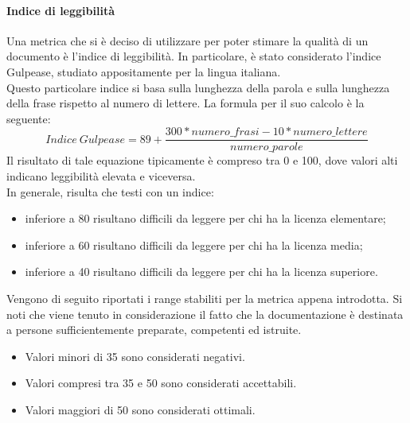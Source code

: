 \documentclass[../PianoDiQualifica.tex]{subfiles}
\begin{document}
				\paragraph{Indice di leggibilità}
				Una metrica che si è deciso di utilizzare per poter stimare la qualità di un documento è l'indice di leggibilità. In particolare, è stato considerato l'indice Gulpease, studiato appositamente per la lingua italiana.				\\Questo particolare indice si basa sulla lunghezza della parola e sulla lunghezza della frase rispetto al numero di lettere. La formula per il suo calcolo è la seguente:
				\begin{equation}
					Indice \  Gulpease = 89 + \frac{300*numero\_frasi-10*numero\_lettere}{numero\_parole}
				\end{equation}
				Il risultato di tale equazione tipicamente è compreso tra 0 e 100, dove valori alti indicano leggibilità elevata e viceversa.\\
				In generale, risulta che testi con un indice:
				\begin{itemize}
					\item inferiore a 80 risultano difficili da leggere per chi ha la licenza elementare;
					\item inferiore a 60 risultano difficili da leggere per chi ha la licenza media;
				\item inferiore a 40 risultano difficili da leggere per chi ha la licenza superiore.
				\end{itemize}
				Vengono di seguito riportati i range stabiliti per la metrica appena introdotta. Si noti che viene tenuto in considerazione il fatto che la documentazione è destinata a persone sufficientemente preparate, competenti ed istruite.
				\begin{itemize}
					\item Valori minori di 35 sono considerati negativi.
					\item Valori compresi tra 35 e 50 sono considerati accettabili.
					\item Valori maggiori di 50 sono considerati ottimali. 
				\end{itemize}
\end{document}
